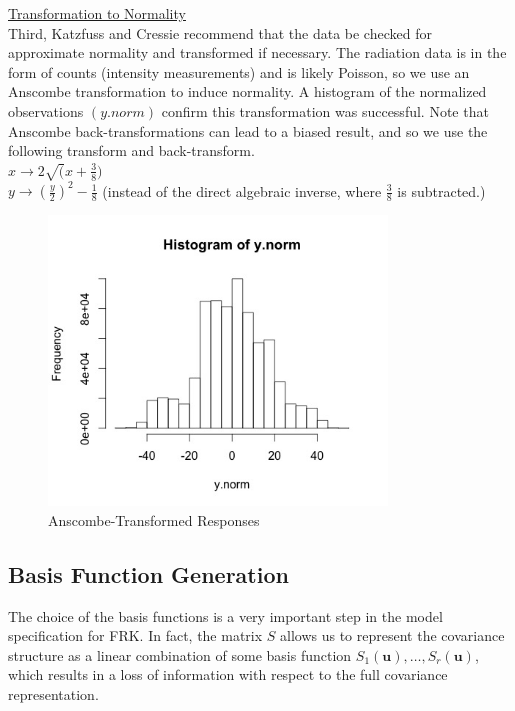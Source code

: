 \documentclass[11pt]{article}
\newcommand{\myindent}{\hspace*{1cm}}
\begin{document}
\underline{Transformation to Normality}\\
Third, Katzfuss and Cressie recommend that the data be checked for approximate normality and transformed if necessary.  The radiation data is in the form of counts (intensity measurements) and is likely Poisson, so we use an Anscombe transformation to induce normality.  A histogram of the normalized observations $(y.norm)$ confirm this transformation was successful.  Note that Anscombe back-transformations can lead to a biased result, and so we use the following transform and back-transform. \\

\myindent $x \rightarrow 2\sqrt(x + \frac{3}{8})$\\
\myindent $y \rightarrow \left(\frac{y}{2}\right)^2 - \frac{1}{8}$ 
\myindent (instead of the direct algebraic inverse, where $\frac{3}{8}$ is subtracted.)

\begin{figure}[h!]
\centering
\includegraphics[width=90mm,keepaspectratio]{Images/histogram_ynorm.jpg}
\caption{Anscombe-Transformed Responses \label{fig:3}}
\end{figure}

\newpage
\subsection{Basis Function Generation}

The choice of the basis functions is a very important step in the model specification for FRK. In fact, the matrix $S$ allows us to represent the covariance structure as a linear combination of some basis function $S_1(\bm{u}), \dots, S_r(\bm{u})$, which results in a loss of information with respect to the full covariance representation.
\end{document}

